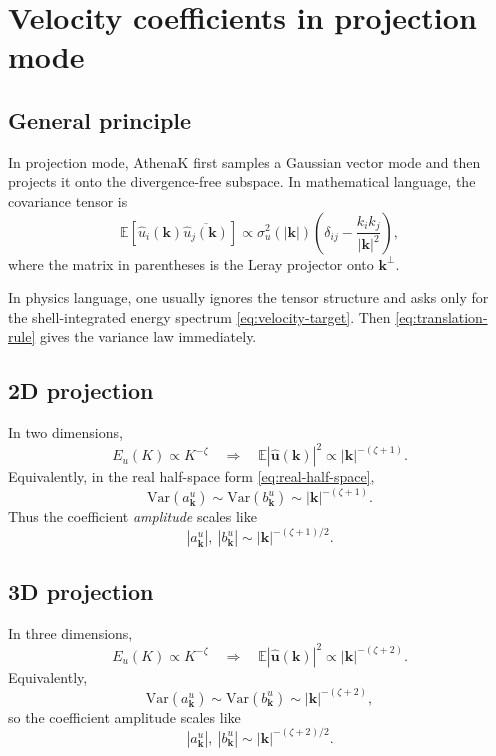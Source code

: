 \documentclass[11pt]{article}
\newcommand{\E}{\mathbb{E}}
\newcommand{\Var}{\mathrm{Var}}
\newcommand{\kk}{\mathbf{k}}
\newcommand{\uu}{\mathbf{u}}
\begin{document}
\section{Velocity coefficients in projection mode}
\subsection{General principle}
In projection mode, AthenaK first samples a Gaussian vector mode and then projects it onto the divergence-free subspace. In mathematical language, the covariance tensor is
\begin{equation}
\E\!\left[\hat{u}_i(\kk)\overline{\hat{u}_j(\kk)}\right]
\propto \sigma_u^2(|\kk|)
\left(\delta_{ij}-\frac{k_i k_j}{|\kk|^2}\right),
\label{eq:projection-covariance}
\end{equation}
where the matrix in parentheses is the Leray projector onto $\kk^\perp$.

In physics language, one usually ignores the tensor structure and asks only for the shell-integrated energy spectrum \eqref{eq:velocity-target}. Then \eqref{eq:translation-rule} gives the variance law immediately.

\subsection{2D projection}
In two dimensions,
\begin{equation}
E_u(K)\propto K^{-\zeta}
\quad\Longrightarrow\quad
\E |\hat{\uu}(\kk)|^2 \propto |\kk|^{-(\zeta+1)}.
\label{eq:2d-velocity-variance}
\end{equation}
Equivalently, in the real half-space form \eqref{eq:real-half-space},
\begin{equation}
\Var(a_{\kk}^{u})\sim \Var(b_{\kk}^{u})\sim |\kk|^{-(\zeta+1)}.
\end{equation}
Thus the coefficient \emph{amplitude} scales like
\begin{equation}
|a_{\kk}^{u}|,\ |b_{\kk}^{u}| \sim |\kk|^{-(\zeta+1)/2}.
\end{equation}

\subsection{3D projection}
In three dimensions,
\begin{equation}
E_u(K)\propto K^{-\zeta}
\quad\Longrightarrow\quad
\E |\hat{\uu}(\kk)|^2 \propto |\kk|^{-(\zeta+2)}.
\label{eq:3d-velocity-variance}
\end{equation}
Equivalently,
\begin{equation}
\Var(a_{\kk}^{u})\sim \Var(b_{\kk}^{u})\sim |\kk|^{-(\zeta+2)},
\end{equation}
so the coefficient amplitude scales like
\begin{equation}
|a_{\kk}^{u}|,\ |b_{\kk}^{u}| \sim |\kk|^{-(\zeta+2)/2}.
\end{equation}
\end{document}
